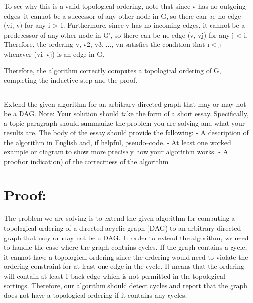\documentclass{article}
\begin{document}
To see why this is a valid topological ordering, note that since v has no outgoing edges, it cannot be a successor of any other node in G, so there can be no edge (vi, v) for any i > 1. Furthermore, since v has no incoming edges, it cannot be a predecessor of any other node in G', so there can be no edge (v, vj) for any j < i. Therefore, the ordering v, v2, v3, ..., vn satisfies the condition that i < j whenever (vi, vj) is an edge in G.\newline

Therefore, the algorithm correctly computes a topological ordering of G, completing the inductive step and the proof.\newline

\subsection{}
\large Extend the given	algorithm for an arbitrary directed graph that may or may not be a DAG. Note: Your solution should take the form of a short essay. Specifically, a	topic paragraph should summarize the problem you are solving	and what your results are. The body	of the essay should	provide	
the	following:\newline
- A	description	of the algorithm in	English	and, if helpful, pseudo–code.\newline
- At least one	worked	example	or	diagram	to	show more precisely how your algorithm works.\newline
- A proof(or indication) of	the	correctness	of the algorithm.

\section*{\Large Proof:}
The problem we are solving is to extend the given algorithm for computing a topological ordering of a directed acyclic graph (DAG) to an arbitrary directed graph that may or may not be a DAG.\newline
In order to extend the algorithm, we need to handle the case where the graph contains cycles. If the graph contains a cycle, it cannot have a topological ordering since the ordering would need to violate the ordering constraint for at least one edge in the cycle. It means that the ordering will contain at least 1 back edge which is not permitted in the topological sortings. Therefore, our algorithm should detect cycles and report that the graph does not have a topological ordering if it contains any cycles.\newline
\end{document}
